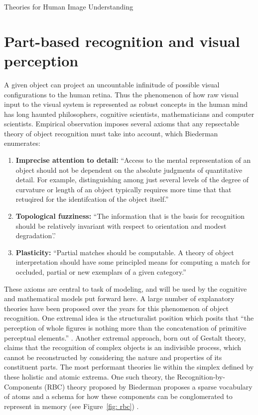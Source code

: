\documentclass[12pt]{pom_thesis}
\begin{document}
\begin{chapter}{Theories for Human Image Understanding}
\section{Part-based recognition and visual perception}
A given object can project an uncountable infinitude of possible visual configurations to the human retina. Thus the phenomenon of how raw visual input to the visual system is represented as robust concepts in the human mind has long haunted philosophers, cognitive scientists, mathematicians and computer scientists. Empirical observation imposes several axioms that any repsectable theory of object recognition must take into account, which Biederman enumerates:
\begin{enumerate}
	\item \textbf{Imprecise attention to detail:} ``Access to the mental representation of an object should not be dependent on the absolute judgments of quantitative detail. For example, distinguishing among just several levels of the degree of curvature or length of an object typically requires more time that that retuqired for the identifcation of the object itself.''
	\item \textbf{Topological fuzziness:} ``The information that is the basis for recognition should be relatively invariant with respect to orientation and modest degradation'.'
	\item \textbf{Plasticity:} ``Partial matches should be computable. A theory of object interpretation should have some principled means for computing a match for occluded, partial or new exemplars of a given category.''
\end{enumerate}
These axioms are central to task of modeling, and will be used by the cognitive and mathematical models put forward here. A large number of explanatory theories have been proposed over the years for this phenomenon of object recognition. One extremal idea is the structuralist position which posits that ``the perception of whole figures is nothing more than the concatenation of primitive perceptual elements.'' \cite{palmer1977hierarchical}. Another extremal approach, born out of Gestalt theory, claims that the recognition of complex objects is an indivisible process, which cannot be reconstructed by considering the nature and properties of its constituent parts.  The most performant theories lie within the simplex defined by these holistic and atomic extrema. One such theory, the Recognition-by-Components (RBC) theory proposed by Biederman proposes a sparse vocabulary of atoms and a schema for how these components can be conglomerated to represent in memory (see Figure~\ref{fig: rbc}) \cite{biederman1987recognition}.

\end{chapter}
\end{document}
